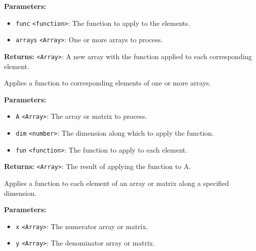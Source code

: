 \documentclass[12pt,a4paper]{article}
\begin{document}
\vspace{5mm}
\noindent {}


\noindent \textbf{Parameters:}
\begin{itemize}
  \item \texttt{func} \texttt{<function>}: The function to apply to the elements.
  \item \texttt{arrays} \texttt{<Array>}: One or more arrays to process.
\end{itemize}

\noindent \textbf{Returns:} \texttt{<Array>}: A new array with the function applied to each corresponding element.

\noindent Applies a function to corresponding elements of one or more arrays.

\vspace{5mm}
\noindent {}


\noindent \textbf{Parameters:}
\begin{itemize}
  \item \texttt{A} \texttt{<Array>}: The array or matrix to process.
  \item \texttt{dim} \texttt{<number>}: The dimension along which to apply the function.
  \item \texttt{fun} \texttt{<function>}: The function to apply to each element.
\end{itemize}

\noindent \textbf{Returns:} \texttt{<Array>}: The result of applying the function to A.

\noindent Applies a function to each element of an array or matrix along a specified dimension.

\vspace{5mm}
\noindent {}


\noindent \textbf{Parameters:}
\begin{itemize}
  \item \texttt{x} \texttt{<Array>}: The numerator array or matrix.
  \item \texttt{y} \texttt{<Array>}: The denominator array or matrix.
\end{itemize}
\end{document}
